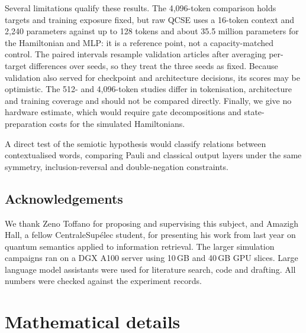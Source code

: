 \documentclass[11pt,a4paper]{article}
\begin{document}
Several limitations qualify these results. The 4,096-token comparison holds targets and training exposure fixed, but raw QCSE uses a 16-token context and 2,240 parameters against up to 128 tokens and about 35.5 million parameters for the Hamiltonian and MLP: it is a reference point, not a capacity-matched control. The paired intervals resample validation articles after averaging per-target differences over seeds, so they treat the three seeds as fixed. Because validation also served for checkpoint and architecture decisions, its scores may be optimistic. The 512- and 4,096-token studies differ in tokenisation, architecture and training coverage and should not be compared directly. Finally, we give no hardware estimate, which would require gate decompositions and state-preparation costs for the simulated Hamiltonians.

A direct test of the semiotic hypothesis would classify relations between contextualised words, comparing Pauli and classical output layers under the same symmetry, inclusion-reversal and double-negation constraints.

\FloatBarrier
\begin{samepage}
\section*{Acknowledgements}
We thank Zeno Toffano for proposing and supervising this subject, and Amazigh Hall, a fellow CentraleSupélec student, for presenting his work from last year on quantum semantics applied to information retrieval. The larger simulation campaigns ran on a DGX A100 server using 10\,GB and 40\,GB GPU slices. Large language model assistants were used for literature search, code and drafting. All numbers were checked against the experiment records.
\par\end{samepage}


\ifdefined\bodyonlyflag\else
  
\fi

\ifdefined\bodyonlyflag\else
  \clearpage
  \appendix

  \section{Mathematical details}
  \label{app:math}
\end{document}
